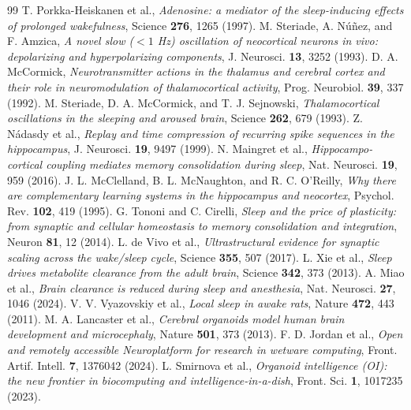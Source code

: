 \begin{thebibliography}{99}
 T. Porkka-Heiskanen et al., \emph{Adenosine: a mediator of the sleep-inducing effects of prolonged wakefulness}, Science \textbf{276}, 1265 (1997).
 M. Steriade, A. N\'u\~nez, and F. Amzica, \emph{A novel slow ($<1$ Hz) oscillation of neocortical neurons in vivo: depolarizing and hyperpolarizing components}, J. Neurosci. \textbf{13}, 3252 (1993).
 D. A. McCormick, \emph{Neurotransmitter actions in the thalamus and cerebral cortex and their role in neuromodulation of thalamocortical activity}, Prog. Neurobiol. \textbf{39}, 337 (1992).
 M. Steriade, D. A. McCormick, and T. J. Sejnowski, \emph{Thalamocortical oscillations in the sleeping and aroused brain}, Science \textbf{262}, 679 (1993).
 Z. N\'adasdy et al., \emph{Replay and time compression of recurring spike sequences in the hippocampus}, J. Neurosci. \textbf{19}, 9497 (1999).
 N. Maingret et al., \emph{Hippocampo-cortical coupling mediates memory consolidation during sleep}, Nat. Neurosci. \textbf{19}, 959 (2016).
 J. L. McClelland, B. L. McNaughton, and R. C. O'Reilly, \emph{Why there are complementary learning systems in the hippocampus and neocortex}, Psychol. Rev. \textbf{102}, 419 (1995).
 G. Tononi and C. Cirelli, \emph{Sleep and the price of plasticity: from synaptic and cellular homeostasis to memory consolidation and integration}, Neuron \textbf{81}, 12 (2014).
 L. de Vivo et al., \emph{Ultrastructural evidence for synaptic scaling across the wake/sleep cycle}, Science \textbf{355}, 507 (2017).
 L. Xie et al., \emph{Sleep drives metabolite clearance from the adult brain}, Science \textbf{342}, 373 (2013).
 A. Miao et al., \emph{Brain clearance is reduced during sleep and anesthesia}, Nat. Neurosci. \textbf{27}, 1046 (2024).
 V. V. Vyazovskiy et al., \emph{Local sleep in awake rats}, Nature \textbf{472}, 443 (2011).
 M. A. Lancaster et al., \emph{Cerebral organoids model human brain development and microcephaly}, Nature \textbf{501}, 373 (2013).
 F. D. Jordan et al., \emph{Open and remotely accessible Neuroplatform for research in wetware computing}, Front. Artif. Intell. \textbf{7}, 1376042 (2024).
 L. Smirnova et al., \emph{Organoid intelligence (OI): the new frontier in biocomputing and intelligence-in-a-dish}, Front. Sci. \textbf{1}, 1017235 (2023).

\end{thebibliography}
